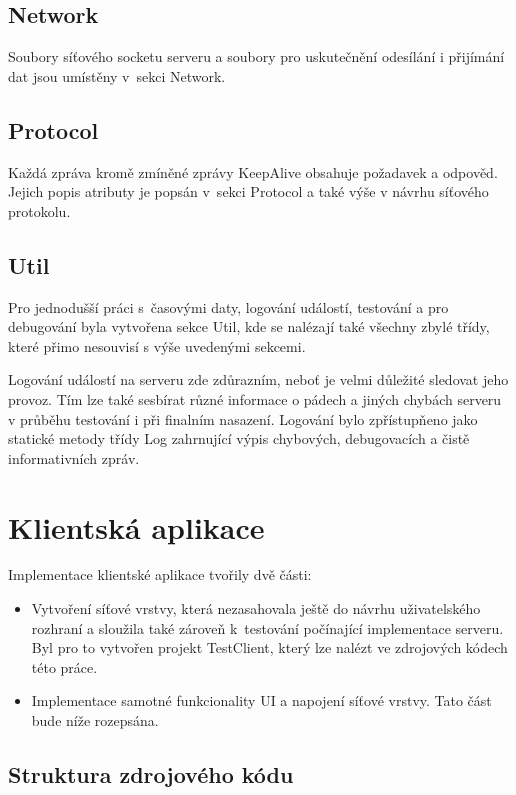 \documentclass[thesis=B,czech]{FITthesis}[2013/10/20]
\begin{document}
\subsection{Network}
Soubory síťového socketu serveru a soubory pro uskutečnění odesílání i přijímání dat jsou umístěny v~sekci Network. 

\subsection{Protocol}
Každá zpráva kromě zmíněné zprávy KeepAlive obsahuje požadavek a odpověd. Jejich popis atributy je popsán v~sekci Protocol a také výše v návrhu síťového protokolu.

\subsection{Util}
Pro jednodušší práci s~časovými daty, logování událostí, testování a pro debugování byla vytvořena sekce Util, kde se nalézají také všechny zbylé třídy, které přimo nesouvisí s výše uvedenými sekcemi.

Logování událostí na serveru zde zdůrazním, neboť je velmi důležité sledovat jeho provoz. Tím lze také sesbírat různé informace o pádech a jiných chybách serveru v průběhu testování i při finalním nasazení. Logování bylo zpřístupňeno jako statické metody třídy Log zahrnující výpis chybových, debugovacích a čistě informativních zpráv.

\section{Klientská aplikace}

Implementace klientské aplikace tvořily dvě části:

\begin{itemize}
	\item{Vytvoření síťové vrstvy, která nezasahovala ještě do návrhu uživatelského rozhraní a sloužila také zároveň k~testování počínající implementace serveru. Byl pro to vytvořen projekt TestClient, který lze nalézt ve zdrojových kódech této práce.}
	\item{Implementace samotné funkcionality UI a napojení síťové vrstvy. Tato část bude níže rozepsána.}
\end{itemize}

\subsection{Struktura zdrojového kódu}
\end{document}
